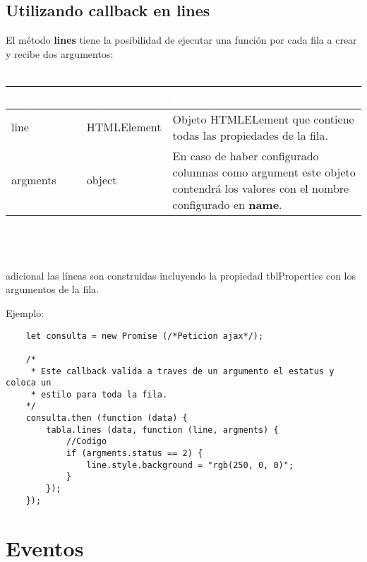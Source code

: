 \documentclass[10pt]{article}
\begin{document}
\subsection{Utilizando callback en lines}

El método \textbf{lines} tiene la posibilidad de ejecutar una función por cada fila a crear y recibe dos argumentos:
\\\\
\begin{tabular}{|m{1.8cm}|m{2.5cm}|m{10.4cm}|}
	\hline
	\rowcolor{black}\textcolor{white}{Argumento} & \textcolor{white}{Tipo} & \textcolor{white}{Descripción} \\
	\hline
	line & HTMLElement & Objeto HTMLELement que contiene todas las propiedades de la fila. \\
	\hline
	argments & object & En caso de haber configurado columnas como argument este objeto contendrá los valores con el nombre configurado en \textbf{name}. \\
	\hline
\end{tabular}
\\\\\\
adicional las líneas son construidas incluyendo la propiedad tblProperties con los argumentos de la fila.

\newpage
Ejemplo:

\begin{lstlisting}
	let consulta = new Promise (/*Peticion ajax*/);
	
	/*
	 * Este callback valida a traves de un argumento el estatus y coloca un
	 * estilo para toda la fila.
	*/
	consulta.then (function (data) {
		tabla.lines (data, function (line, argments) {
			//Codigo
			if (argments.status == 2) {
				line.style.background = "rgb(250, 0, 0)";
			}
		});
	});
\end{lstlisting}

\section{Eventos}
\end{document}
